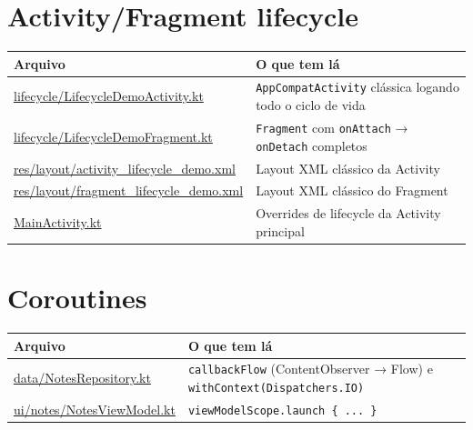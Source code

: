 \documentclass[11pt,a4paper]{article}
\newcommand{\repobase}{https://github.com/stpedr/curriculo/blob/claude/jetpack-compose-review-r09a59/jetpack-compose-review/}
\begin{document}
\section*{Activity/Fragment lifecycle}
\begin{longtable}{L{5.4cm}L{8.5cm}}
\textbf{Arquivo} & \textbf{O que tem lá} \\ \hline \endhead
\href{\repobase app/src/main/java/com/pedro/composereview/lifecycle/LifecycleDemoActivity.kt\#L20}{\url{lifecycle/LifecycleDemoActivity.kt}} &
\texttt{AppCompatActivity} clássica logando todo o ciclo de vida \\
\href{\repobase app/src/main/java/com/pedro/composereview/lifecycle/LifecycleDemoFragment.kt\#L26}{\url{lifecycle/LifecycleDemoFragment.kt}} &
\texttt{Fragment} com \texttt{onAttach} → \texttt{onDetach} completos \\
\href{\repobase app/src/main/res/layout/activity_lifecycle_demo.xml}{\url{res/layout/activity\_lifecycle\_demo.xml}} &
Layout XML clássico da Activity \\
\href{\repobase app/src/main/res/layout/fragment_lifecycle_demo.xml}{\url{res/layout/fragment\_lifecycle\_demo.xml}} &
Layout XML clássico do Fragment \\
\href{\repobase app/src/main/java/com/pedro/composereview/MainActivity.kt\#L59}{\url{MainActivity.kt}} &
Overrides de lifecycle da Activity principal \\
\end{longtable}

\section*{Coroutines}
\begin{longtable}{L{5.4cm}L{8.5cm}}
\textbf{Arquivo} & \textbf{O que tem lá} \\ \hline \endhead
\href{\repobase app/src/main/java/com/pedro/composereview/data/NotesRepository.kt\#L32}{\url{data/NotesRepository.kt}} &
\texttt{callbackFlow} (ContentObserver → Flow) e \texttt{withContext(Dispatchers.IO)} \\
\href{\repobase app/src/main/java/com/pedro/composereview/ui/notes/NotesViewModel.kt\#L60}{\url{ui/notes/NotesViewModel.kt}} &
\texttt{viewModelScope.launch \{ ... \}} \\
\end{longtable}
\end{document}
